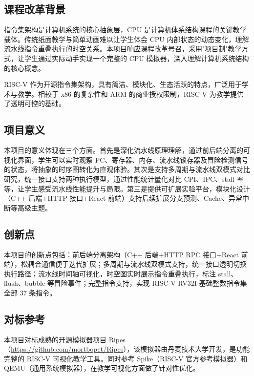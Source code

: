 \documentclass[12pt, a4paper]{article}
\begin{document}
\subsection{课程改革背景}

指令集架构是计算机系统的核心抽象层，CPU 是计算机体系结构课程的关键教学载体。传统纸面教学与简单动画难以让学生体会 CPU 内部状态的动态变化，理解流水线指令重叠执行的时空关系。本项目响应课程改革号召，采用"项目制"教学方式，让学生通过实际动手实现一个完整的 CPU 模拟器，深入理解计算机系统结构的核心概念。

RISC-V 作为开源指令集架构，具有简洁、模块化、生态活跃的特点，广泛用于学术与教学。相较于 x86 的复杂性和 ARM 的商业授权限制，RISC-V 为教学提供了透明可控的基础。

\subsection{项目意义}

本项目的意义体现在三个方面。首先是深化流水线原理理解，通过前后端分离的可视化界面，学生可以实时观察 PC、寄存器、内存、流水线锁存器及冒险检测信号的状态，将抽象的时序图转化为直观体验。其次是支持多周期与流水线双模式对比研究，统一接口支持两种执行模型，通过性能统计量化对比 CPI、IPC、stall 率等，让学生感受流水线性能提升与局限。第三是提供可扩展实验平台，模块化设计（C++ 后端+HTTP 接口+React 前端）支持后续扩展分支预测、Cache、异常中断等高级主题。

\subsection{创新点}

本项目的创新点包括：前后端分离架构（C++ 后端+HTTP RPC 接口+React 前端），松耦合通信便于迭代扩展；多周期与流水线双模式支持，统一接口透明切换执行路径；流水线时间轴可视化，时空图实时展示指令重叠执行，标注 stall、flush、bubble 等冒险事件；完整指令支持，实现 RISC-V RV32I 基础整数指令集全部 37 条指令。

\subsection{对标参考}

本项目对标成熟的开源模拟器项目 Ripes（\url{https://github.com/mortbopet/Ripes}），该模拟器由丹麦技术大学开发，是功能完整的 RISC-V 可视化教学工具。同时参考 Spike（RISC-V 官方参考模拟器）和 QEMU（通用系统模拟器），在教学可视化方面做了针对性优化。

\vspace{1cm}
\end{document}
